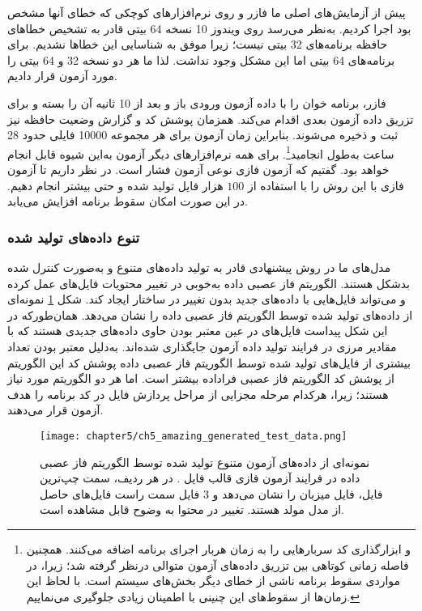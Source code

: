 پیش از آزمایش‌های اصلی ما فازر و  روی نرم‌افزارهای کوچکی که خطای آنها مشخص بود اجرا کردیم. به‌نظر می‌رسد  روی ویندوز 10 نسخه 64 بیتی قادر به تشخیص خطاهای حافظه برنامه‌های 32 بیتی نیست؛ زیرا موفق به شناسایی این خطاها نشدیم. برای برنامه‌های 64 بیتی اما این مشکل وجود نداشت. لذا ما هر دو نسخه 32 و 64 بیتی  را مورد آزمون قرار دادیم. 

فازر، برنامه خوان را با داده آزمون ورودی باز و بعد از 10 ثانیه آن را بسته و برای تزریق داده آزمون بعدی اقدام می‌کند. همزمان پوشش کد و گزارش وضعیت حافظه نیز ثبت و ذخیره می‌شوند. بنابراین زمان آزمون برای هر مجموعه 10000 فایلی حدود 28 ساعت به‌طول انجامید\footnote{
		 و ابزارگذاری کد سربارهایی را به زمان هربار اجرای برنامه اضافه می‌کنند. همچنین فاصله زمانی کوتاهی بین تزریق داده‌های آزمون متوالی درنظر گرفته شد؛ زیرا، در مواردی سقوط برنامه ناشی از خطای دیگر بخش‌های سیستم است. با لحاظ این زمان‌ها از سقوط‌های این چنینی با اطمینان زیادی جلوگیری می‌نماییم.
	  }. 
برای همه نرم‌افزارهای دیگر آزمون به‌این شیوه قابل انجام خواهد بود. گفتیم که آزمون فازی نوعی آزمون فشار است. در نظر داریم تا آزمون فازی با این روش را با استفاده از $100$ هزار فایل تولید شده و حتی بیشتر انجام دهیم. در این صورت امکان سقوط برنامه  افزایش می‌یابد.



\subsubsection{تنوع داده‌های تولید شده}
مدل‌های ما در روش پیشنهادی قادر به تولید داده‌های متنوع و به‌صورت کنترل شده بدشکل هستند. الگوریتم فاز عصبی داده به‌خوبی در تغییر محتویات فایل‌های 
عمل کرده و می‌تواند فایل‌هایی با داده‌های جدید بدون تغییر در ساختار ایجاد کند. شکل \ref{ch5_amazing_generated_test_data.png} نمونه‌ای از داده‌های تولید شده توسط الگوریتم فاز عصبی داده را نشان می‌دهد. همان‌طورکه در این شکل پیداست فایل‌های  در عین معتبر بودن حاوی داده‌های جدیدی هستند که با مقادیر مرزی در فرایند تولید داده آزمون جایگذاری شده‌اند. به‌دلیل معتبر بودن تعداد بیشتری از فایل‌های تولید شده توسط الگوریتم فاز عصبی داده پوشش کد این الگوریتم از پوشش کد الگوریتم فاز عصبی فراداده بیشتر است. اما هر دو الگوریتم مورد نیاز هستند؛ زیرا، هرکدام مرحله مجزایی از مراحل پردازش فایل در کد برنامه را هدف آزمون قرار می‌دهند.



\begin{figure}[ht]%
	\centering
	\texttt{[image: chapter5/ch5\_amazing\_generated\_test\_data.png]}
	\caption[نمونه‌ای از داده‌های آزمون متنوع تولید شده توسط الگوریتم فاز عصبی داده در فرایند آزمون فازی قالب فایل .]
	{
		نمونه‌ای از داده‌های آزمون متنوع تولید شده توسط الگوریتم فاز عصبی داده در فرایند آزمون فازی قالب فایل . در هر ردیف، سمت چپ‌ترین فایل، فایل میزبان را نشان می‌دهد و 3 فایل سمت راست فایل‌های حاصل از مدل مولد هستند. تغییر در محتوا به وضوح قابل مشاهده است.
	}
	\label{ch5_amazing_generated_test_data.png}
\end{figure}





